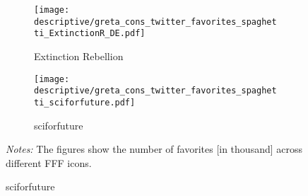 \documentclass[11pt, a4paper]{article} %
\begin{document}
\begin{landscape}
\begin{figure}[H]
		\begin{subfigure}[h]{0.23\linewidth}\centering\caption{Extinction Rebellion}
			\texttt{[image: descriptive/greta\_cons\_twitter\_favorites\_spaghetti\_ExtinctionR\_DE.pdf]}
		\end{subfigure}
		\begin{subfigure}[h]{0.23\linewidth}\centering\caption{sciforfuture}
			\texttt{[image: descriptive/greta\_cons\_twitter\_favorites\_spaghetti\_sciforfuture.pdf]}
		\end{subfigure}
		\begin{minipage}{\linewidth}
			\scriptsize{\emph{Notes:} The figures show the number of favorites [in thousand] across different FFF icons.}
		\end{minipage}
	\end{figure}

\end{landscape}
\end{document}
